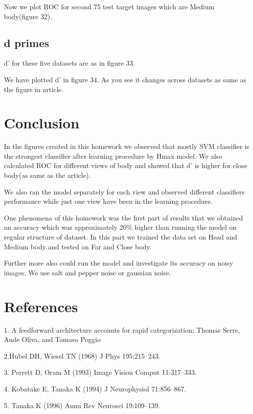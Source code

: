 \documentclass[9pt,twocolumn]{paper-template}
\begin{document}
Now we plot ROC for second 75 test target images which are Medium body(figure 32).







\subsection*{d primes}


d' for these five datasets are as in figure 33.



We have plotted d' in figure 34. As you see it changes across datasets as same as the figure in article.



			
			
			
			
			
\section{Conclusion}	

In the figures created in this homework we observed that mostly SVM classifier is the strongest classifier after learning procedure by Hmax model. We also calculated ROC for different views of body and showed that d' is higher for close body(as same as the article).

 We also ran the model separately for each view and observed different classifiers performance while just one view have been in the learning procedure.
 
 One phenomena of this homework was the first part of results that we obtained an accuracy which was approximately 20\% higher than running the model on regular structure of dataset. In this part we trained the data set on Head and Medium body and tested on Far and Close body.
			
			
			Further more also could run the model and investigate its accuracy on noisy images. We use salt and pepper noise or gaussian noise.
			

\showacknow{} %

\section*{References}
%

1. A feedforward architecture accounts
for rapid categorization; Thomas Serre, Aude Oliva, and Tomaso Poggio
			
	2.Hubel DH, Wiesel TN (1968) J Phys 195:215–243.
	
	
3.	Perrett D, Oram M (1993) Image Vision Comput 11:317–333.

	4. Kobatake E, Tanaka K (1994) J Neurophysiol 71:856–867.
	
	5. Tanaka K (1996) Annu Rev Neurosci 19:109–139.	
	
\end{document}
